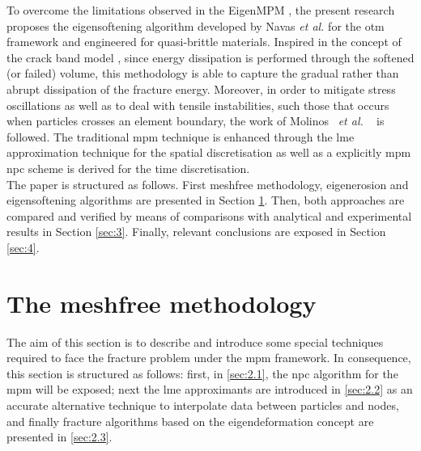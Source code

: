\documentclass[preprint,12pt,a4paper]{elsarticle}
\newcommand{\etal}{
  \textit{et al.}
}
\begin{document}
To overcome the limitations observed in the EigenMPM
\cite{Zhang_EE_2020}, the present research proposes the eigensoftening
algorithm developed by Navas {\it et al.}
\cite{Navas_2017_ES,Navas2018a} for the \acrshort{otm} framework and
engineered for quasi-brittle materials. Inspired in the concept of the
crack band model \cite{Bazant83}, since energy dissipation is performed through the softened (or failed) volume, this methodology is able to capture the gradual rather than abrupt
dissipation of the fracture energy. Moreover, in order to mitigate stress
oscillations as well as to deal with tensile instabilities, such those that
occurs when particles crosses an element boundary, the work of Molinos~\etal~\cite{Molinos2020} is followed. The traditional \acrshort{mpm} technique is enhanced through the \acrfull{lme} approximation technique
\cite{Arroyo2006} for the spatial discretisation as well as a explicitly \acrshort{mpm} \acrfull{npc} scheme is derived for the time discretisation.\\

The paper is structured as follows. First meshfree methodology,
eigenerosion and eigensoftening algorithms are presented in Section
\ref{sec:2}. Then, both approaches are compared and verified by means of
comparisons with analytical and experimental results in Section
\ref{sec:3}. Finally, relevant conclusions are exposed in Section \ref{sec:4}.

\section{The meshfree methodology}
\label{sec:2}

The aim of this section is to describe and introduce some special
techniques required to face the fracture problem under the \acrshort{mpm}
framework. In consequence, this section is structured as follows: first, in
\ref{sec:2.1}, the \acrfull{npc} algorithm for the \acrshort{mpm}
will be exposed; next the \acrshort{lme} approximants are
introduced in \ref{sec:2.2} as an accurate alternative technique to
interpolate data between particles and nodes, and finally fracture
algorithms based on the eigendeformation concept are presented in
\ref{sec:2.3}.
\end{document}
